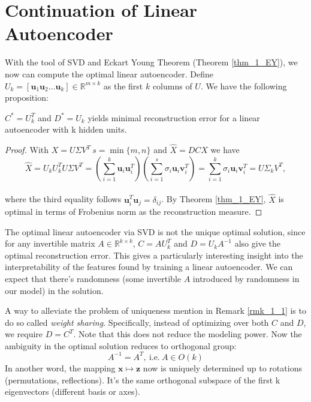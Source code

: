 \documentclass[../book-template.tex]{subfiles}
\begin{document}
\section{Continuation of Linear Autoencoder}
With the tool of SVD and Eckart Young Theorem (Theorem \ref{thm_1_EY}), we now can compute the optimal linear autoencoder. Define $U_k=[\bm{u}_1\bm{u}_2\dots \bm{u}_k]\in \mathbb{R}^{m\times k}$ as the first $k$ columns of $U$. We have the following proposition:
\begin{proposition}
$C^*=U_k^T$ and $D^*=U_k$ yields minimal reconstruction error for a linear autoencoder with k hidden units.
\end{proposition}
\begin{proof}
With $X=U\Sigma V^T\ s=\min\{m,n\}$ and $\hat{X}=DCX$ we have
\begin{equation*}
    \hat{X} = U_k U_k^T U\Sigma V^T = \left(\sum_{i=1}^{k}\bm{u}_i\bm{u}^T_i\right)\left(\sum_{i=1}^{s}\sigma_i\bm{u}_i\bm{v}^T_i\right) = \sum_{i=1}^{k}\sigma_i\bm{u}_i\bm{v}^T_i = U\Sigma_kV^T,
\end{equation*}\\
where the third equality follows $\bm{u}_i^T\bm{u}_j=\delta_{ij}$. By Theorem \ref{thm_1_EY}, $\hat{X}$ is optimal in terms of Frobenius norm as the reconstruction measure.
\end{proof}
\begin{remark}\label{rmk_1_1}
The optimal linear autoencoder via SVD is not the unique optimal solution, since for any invertible matrix $A\in\mathbb{R}^{k\times k}$, $C=AU_k^T$ and $D=U_kA^{-1}$ also give the optimal reconstruction error. This gives a particularly interesting insight into the interpretability of the features found by training a linear autoencoder. We can expect that there's randomness (some invertible $A$ introduced by randomness in our model) in the solution.
\end{remark}
A way to alleviate the problem of uniqueness mention in Remark \ref{rmk_1_1} is to do so called \emph{weight sharing}. Specifically, instead of optimizing over both $C$ and $D$, we require $D=C^T$. Note that this does not reduce the modeling power. Now the ambiguity in the optimal solution reduces to orthogonal group: 
\begin{equation*}
    A^{-1}=A^T,\ \text{i.e.}\ A\in O(k)
\end{equation*}
In another word, the mapping $\bm{x}\mapsto \bm{z}$ now is uniquely determined up to rotations (permutations, reflections). It's the same orthogonal subspace of the first k eigenvectors (different basis or axes).
\end{document}
